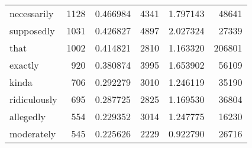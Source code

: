 \begin{table}[ht]
\begin{tabular}{lrrrrr}
necessarily & {\cellcolor[HTML]{C0D4E6}} \color[HTML]{000000} 1128 & {\cellcolor[HTML]{C0D4E6}} \color[HTML]{000000} 0.466984 & {\cellcolor[HTML]{B9CEE4}} \color[HTML]{000000} 4341 & {\cellcolor[HTML]{B9CEE4}} \color[HTML]{000000} 1.797143 & {\cellcolor[HTML]{F1F8FB}} \color[HTML]{000000} 48641 \\
supposedly & {\cellcolor[HTML]{C6D8E9}} \color[HTML]{000000} 1031 & {\cellcolor[HTML]{C6D8E9}} \color[HTML]{000000} 0.426827 & {\cellcolor[HTML]{AFC8E0}} \color[HTML]{000000} 4897 & {\cellcolor[HTML]{AFC8E0}} \color[HTML]{000000} 2.027324 & {\cellcolor[HTML]{F4FAFC}} \color[HTML]{000000} 27339 \\
that & {\cellcolor[HTML]{C7D9E9}} \color[HTML]{000000} 1002 & {\cellcolor[HTML]{C7D9E9}} \color[HTML]{000000} 0.414821 & {\cellcolor[HTML]{D4E3EF}} \color[HTML]{000000} 2810 & {\cellcolor[HTML]{D4E3EF}} \color[HTML]{000000} 1.163320 & {\cellcolor[HTML]{DEEAF3}} \color[HTML]{000000} 206801 \\
exactly & {\cellcolor[HTML]{CCDDEC}} \color[HTML]{000000} 920 & {\cellcolor[HTML]{CCDDEC}} \color[HTML]{000000} 0.380874 & {\cellcolor[HTML]{BFD3E6}} \color[HTML]{000000} 3995 & {\cellcolor[HTML]{BFD3E6}} \color[HTML]{000000} 1.653902 & {\cellcolor[HTML]{F1F7FA}} \color[HTML]{000000} 56109 \\
kinda & {\cellcolor[HTML]{DAE7F1}} \color[HTML]{000000} 706 & {\cellcolor[HTML]{DAE7F1}} \color[HTML]{000000} 0.292279 & {\cellcolor[HTML]{D0E0ED}} \color[HTML]{000000} 3010 & {\cellcolor[HTML]{D0E0ED}} \color[HTML]{000000} 1.246119 & {\cellcolor[HTML]{F3F9FC}} \color[HTML]{000000} 35190 \\
ridiculously & {\cellcolor[HTML]{DAE7F1}} \color[HTML]{000000} 695 & {\cellcolor[HTML]{DAE7F1}} \color[HTML]{000000} 0.287725 & {\cellcolor[HTML]{D4E3EF}} \color[HTML]{000000} 2825 & {\cellcolor[HTML]{D4E3EF}} \color[HTML]{000000} 1.169530 & {\cellcolor[HTML]{F3F9FB}} \color[HTML]{000000} 36804 \\
allegedly & {\cellcolor[HTML]{E1EDF5}} \color[HTML]{000000} 554 & {\cellcolor[HTML]{E1EDF5}} \color[HTML]{000000} 0.229352 & {\cellcolor[HTML]{D0E0ED}} \color[HTML]{000000} 3014 & {\cellcolor[HTML]{D0E0ED}} \color[HTML]{000000} 1.247775 & {\cellcolor[HTML]{F6FBFC}} \color[HTML]{000000} 16230 \\
moderately & {\cellcolor[HTML]{E2EDF5}} \color[HTML]{000000} 545 & {\cellcolor[HTML]{E2EDF5}} \color[HTML]{000000} 0.225626 & {\cellcolor[HTML]{DFEBF4}} \color[HTML]{000000} 2229 & {\cellcolor[HTML]{DFEBF4}} \color[HTML]{000000} 0.922790 & {\cellcolor[HTML]{F4FAFC}} \color[HTML]{000000} 26716 \\

\end{tabular}
\end{table}
